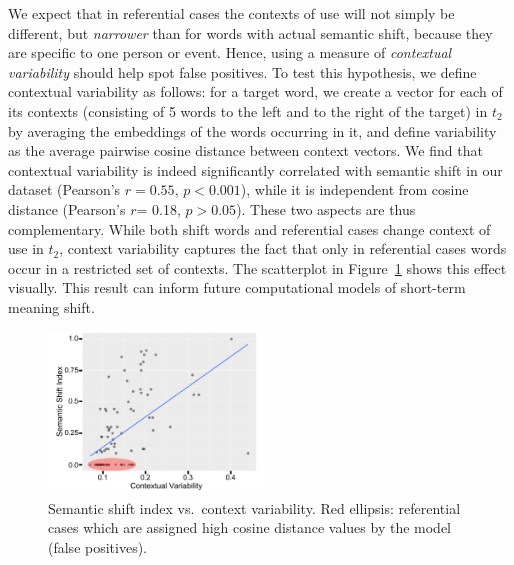 We expect that in referential cases the contexts of use will not
simply be different, but \textit{narrower} than for words with actual
semantic shift, because they are specific to one person or
event. Hence, using a measure of \textit{contextual variability}
should help spot false positives.  To test this hypothesis, we define
contextual variability as follows: for a target word, we create a
vector for each of its contexts (consisting of 5 words to the left and
to the right of the target) in $t_2$ by averaging the embeddings of
the words occurring in it, and define variability as the average
pairwise cosine distance between context vectors.  We find that
contextual variability is indeed significantly correlated with
semantic shift in our dataset (Pearson's $r\!=\!0.55$, $p\!<\!0.001$),
while it is independent from cosine distance (Pearson's $r$= 0.18,
$p> 0.05$). These two aspects are thus complementary. While both shift
words and referential cases change context of use in $t_2$, context
variability captures the fact that only in referential cases words
occur in a restricted set of contexts. The scatterplot in
Figure~\ref{fig:shift-variability} shows this effect visually.  This
result can inform future computational models of short-term meaning
shift.

\begin{figure}[h!]\centering
\includegraphics[height=4.3cm]{images/contextual_variability_shift_index_annotated_3.pdf}
\vspace*{-2pt}
\caption{Semantic shift index vs.~context variability. Red ellipsis: referential cases which are assigned high cosine distance values by the model (false positives).\label{fig:shift-variability}}
\vspace*{-5pt}
\end{figure}




